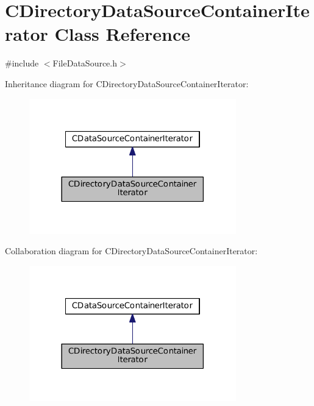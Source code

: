 \hypertarget{classCDirectoryDataSourceContainerIterator}{}\section{C\+Directory\+Data\+Source\+Container\+Iterator Class Reference}
\label{classCDirectoryDataSourceContainerIterator}


{\ttfamily \#include $<$File\+Data\+Source.\+h$>$}



Inheritance diagram for C\+Directory\+Data\+Source\+Container\+Iterator\+:\nopagebreak
\begin{figure}[H]
\begin{center}
\leavevmode
\includegraphics[width=254pt]{classCDirectoryDataSourceContainerIterator__inherit__graph}
\end{center}
\end{figure}


Collaboration diagram for C\+Directory\+Data\+Source\+Container\+Iterator\+:\nopagebreak
\begin{figure}[H]
\begin{center}
\leavevmode
\includegraphics[width=254pt]{classCDirectoryDataSourceContainerIterator__coll__graph}
\end{center}
\end{figure}
